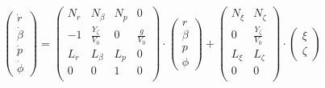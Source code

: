 \begin{equation}\label{eq:seitenbewegung}
	\begin{pmatrix}
		\dot{r}\\
		\dot{\beta}\\
		\dot{p}\\
		\dot{\phi}
	\end{pmatrix} = 
	\begin{pmatrix}
		N_r & N_\beta             & N_p & 0\\
		-1  & \frac{Y_\zeta}{V_0} & 0   & \frac{g}{V_0}\\
		L_r & L_\beta             & L_p & 0\\
		0   & 0                   & 1   & 0\\
	\end{pmatrix} \cdot
	\begin{pmatrix}
		r\\
		\beta\\
		p\\
		\phi
	\end{pmatrix} + 
	\begin{pmatrix}
		N_\xi & N_\zeta\\
		0 & \frac{Y_\zeta}{V_0}\\
		L_\xi & L_\zeta\\
		0 & 0\\
	\end{pmatrix}\cdot
	\begin{pmatrix}
		\xi\\
		\zeta
	\end{pmatrix}
\end{equation}

